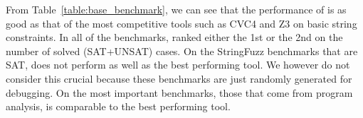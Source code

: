 

From Table~\ref{table:base_benchmark}, we can see that the performance of {\tool} is as good as that of the most competitive tools such as CVC4 and Z3 on basic string constraints. In all of the benchmarks, {\tool} ranked either the 1st or the 2nd on the number of solved (SAT+UNSAT) cases. On the StringFuzz benchmarks that are SAT, {\tool} does not perform as well as the best performing tool. We however do not consider this crucial because these benchmarks are just randomly generated for debugging. On the most important benchmarks, those that come from program analysis, {\tool} is comparable to the best performing tool.

